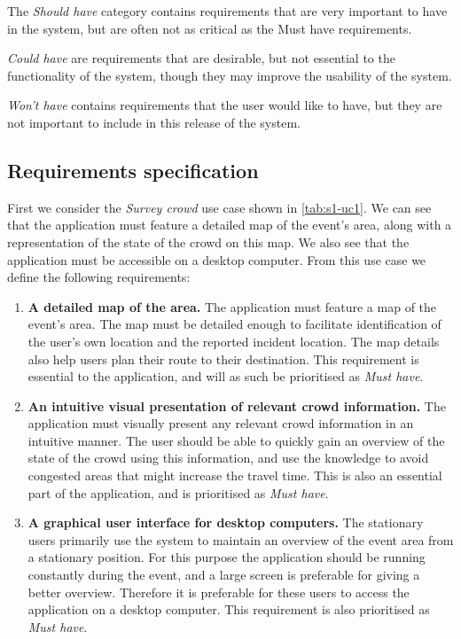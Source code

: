 The \emph{Should have} category contains requirements that are very important to have in the system, but are often not as critical as the Must have requirements. 

\emph{Could have} are requirements that are desirable, but not essential to the functionality of the system, though they may improve the usability of the system. 

\emph{Won't have} contains requirements that the user would like to have, but they are not important to include in this release of the system.

\subsection{Requirements specification}
First we consider the \emph{Survey crowd} use case shown in \cref{tab:s1-uc1}. We can see that the application must feature a detailed map of the event's area, along with a representation of the state of the crowd on this map. We also see that the application must be accessible on a desktop computer. From this use case we define the following requirements:

\begin{enumerate}
    \item \textbf{A detailed map of the area.} The application must feature a map of the event's area. The map must be detailed enough to facilitate identification of the user's own location and the reported incident location. The map details also help users plan their route to their destination. This requirement is essential to the application, and will as such be prioritised as \emph{Must have}.
    \item \textbf{An intuitive visual presentation of relevant crowd information.} The application must visually present any relevant crowd information in an intuitive manner. The user should be able to quickly gain an overview of the state of the crowd using this information, and use the knowledge to avoid congested areas that might increase the travel time. This is also an essential part of the application, and is prioritised as \emph{Must have}.
    \item \textbf{A graphical user interface for desktop computers.} The stationary users primarily use the system to maintain an overview of the event area from a stationary position. For this purpose the application should be running constantly during the event, and a large screen is preferable for giving a better overview. Therefore it is preferable for these users to access the application on a desktop computer. This requirement is also prioritised as \emph{Must have}.
\end{enumerate}

